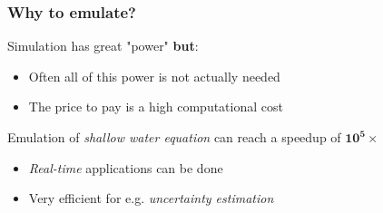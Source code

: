 \documentclass[xcolor=dvipsnames, USenglish]{beamer}  %
\begin{document}
  \begin{frame}
    \frametitle{Why to emulate?}
      Simulation has great "power" \textbf{but}:
      \begin{itemize}
        \item Often all of this power is not actually needed
        \item The price to pay is a high computational cost
      \end{itemize}
      \vspace{.5cm}
      Emulation of \emph{shallow water equation} can reach a speedup of $\boldsymbol{10^5 \times}$
      \begin{itemize}
        \item \emph{Real-time} applications can be done
        \item Very efficient for e.g. \emph{uncertainty estimation}
      \end{itemize}
  \end{frame}
\end{document}
